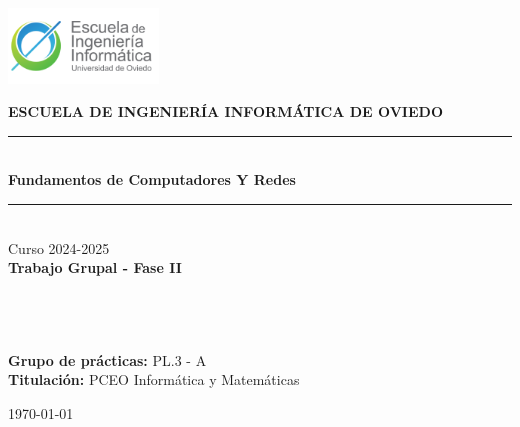 \documentclass[11pt,a4paper]{article}
\begin{document}
\begin{titlepage}
    \begin{center}
        \includegraphics[width=0.3\textwidth]{logo_escuela.png} \\[1cm] %
        \vspace{1cm}
        
        \textbf{\LARGE ESCUELA DE INGENIERÍA INFORMÁTICA DE OVIEDO} \\[1.5cm]
        
        \rule{\linewidth}{0.5mm} \\[0.4cm]
        \textbf{\Huge Fundamentos de Computadores Y Redes} \\[0.3cm]
        \rule{\linewidth}{0.5mm} \\[1cm]
        
        {\Large Curso 2024-2025} \\[1.5cm]
        
        \textbf{\LARGE Trabajo Grupal - Fase II} \\[0.8cm]
        
        \\[0.15cm]
        \\[0.15cm]
        \\[0.15cm]
        
        \vfill
        
        \begin{flushright}
            \textbf{Grupo de prácticas:} PL.3 - A \\[0.3cm]
            \textbf{Titulación:} PCEO Informática y Matemáticas \\[0.3cm]
        \end{flushright}
        
        \vfill
        
        \today \\[1cm]
    \end{center}
  \end{titlepage}
\end{document}
